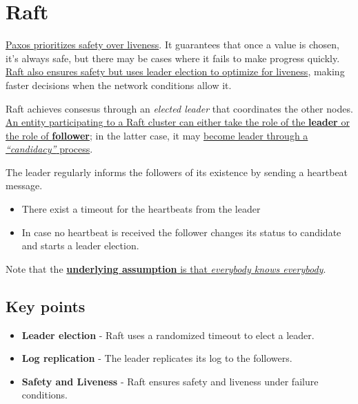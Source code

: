 


\section{Raft}
\ul{Paxos prioritizes safety over liveness}. It guarantees that once a value is chosen, it's always safe, but there may be cases where it fails to make progress quickly.\\
\ul{Raft also ensures safety but uses leader election to optimize for liveness}, making faster decisions when the network conditions allow it.

Raft achieves consesus through an \textit{elected leader} that coordinates the other nodes.
\ul{An entity participating to a Raft cluster can either take the role of the \textbf{leader} or the role of \textbf{follower}};
in the latter case, it may \ul{become leader through a \textit{``candidacy''} process}.\\
{The leader regularly informs the followers of its existence by sending a heartbeat message.\ns
\begin{itemize}
   \item There exist a timeout for the heartbeats from the leader
   \item In case no heartbeat is received the follower changes its status to candidate and starts a leader election.
\end{itemize}}

Note that the \ul{\textbf{underlying assumption} is that \textit{everybody knows everybody}}.

\subsection{Key points}
\begin{itemize}
   \item \textbf{Leader election} - Raft uses a randomized timeout to elect a leader.
   \item \textbf{Log replication} - The leader replicates its log to the followers.
   \item \textbf{Safety and Liveness} - Raft ensures safety and liveness under failure conditions.
\end{itemize}

